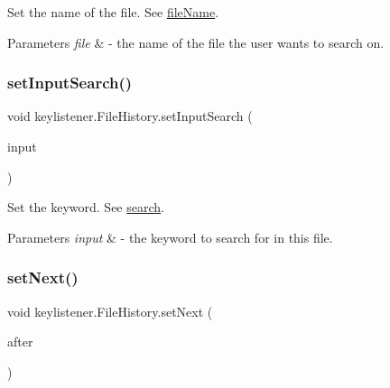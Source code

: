 Set the name of the file. See \hyperlink{classkeylistener_1_1_file_history_aa039d04ae73d6098a0d63f42dcf7a953}{file\+Name}. 
\begin{DoxyParams}{Parameters}
{\em file} & -\/ the name of the file the user wants to search on. \\
\hline
\end{DoxyParams}
\mbox{\label{classkeylistener_1_1_file_history_acaf8a8e1dc879a8ef64e0940ab791bc7}} 
\subsubsection{\texorpdfstring{set\+Input\+Search()}{setInputSearch()}}
{\footnotesize\ttfamily void keylistener.\+File\+History.\+set\+Input\+Search (\begin{DoxyParamCaption}\item[{String}]{input }\end{DoxyParamCaption})\hspace{0.3cm}{\ttfamily [inline]}}

Set the keyword. See \hyperlink{classkeylistener_1_1_file_history_a6370f7f80f43860c1da4962b9e0a3f01}{search}. 
\begin{DoxyParams}{Parameters}
{\em input} & -\/ the keyword to search for in this file. \\
\hline
\end{DoxyParams}
\mbox{\label{classkeylistener_1_1_file_history_a8e5dff723fb93991057375f579486eae}} 
\subsubsection{\texorpdfstring{set\+Next()}{setNext()}}
{\footnotesize\ttfamily void keylistener.\+File\+History.\+set\+Next (\begin{DoxyParamCaption}\item[{\hyperlink{classkeylistener_1_1_file_history}{File\+History}}]{after }\end{DoxyParamCaption})\hspace{0.3cm}{\ttfamily [inline]}}

